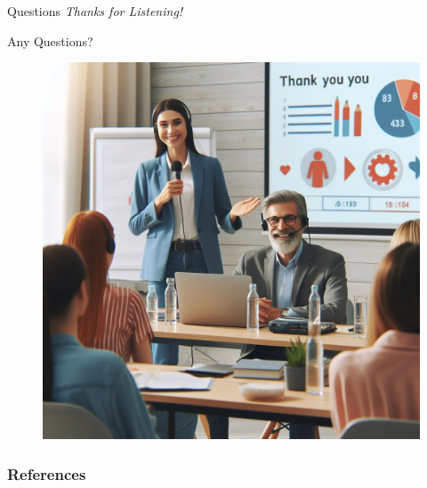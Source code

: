 \documentclass{beamer}
\begin{document}
\begin{frame}{Questions}
  \centering \Large
  \emph{Thanks for Listening!}

  Any Questions?

  \begin{figure}[htbp]
    \centering
    \includegraphics[height=.6\textheight]{Thank_you.jpg}
    \label{fig:Thank_you}
  \end{figure}
\end{frame}

\begin{frame}[allowframebreaks]
  \frametitle{References}
  \printbibliography
\end{frame}
\end{document}
